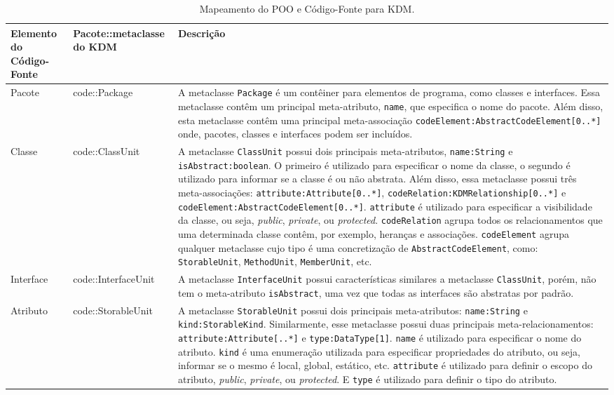 \begin{center}
\begin{longtable}{ | m{1.9cm} | m{3.57cm}| m{9.3cm} | } 
\caption{Mapeamento do POO e Código-Fonte para KDM.\label{tab:mapemanetoEntreOOPeKDM}}\\
\hline
Elemento do Código-Fonte & Pacote::metaclasse do KDM & Descrição \\ 
\hline
Pacote & code::Package & A metaclasse \texttt{Package} é um contêiner para elementos de programa, como classes e interfaces. Essa metaclasse contêm um principal meta-atributo, \texttt{name}, que especifica o nome do pacote. Além disso, esta metaclasse contêm uma principal meta-associação \texttt{codeElement:AbstractCodeElement[0..*]} onde, pacotes, classes e interfaces podem ser incluídos. \\ 
\hline
Classe & code::ClassUnit & A metaclasse \texttt{ClassUnit} possui dois principais meta-atributos,  \texttt{name:String} e \texttt{isAbstract:boolean}. O primeiro é utilizado para especificar o nome da classe, o segundo é utilizado para informar se a classe é ou não abstrata. Além disso, essa metaclasse possui três meta-associações: \texttt{attribute:Attribute[0..*]}, \texttt{codeRelation:KDMRelationship[0..*]} e  \texttt{codeElement:AbstractCodeElement[0..*]}. \texttt{attribute} é utilizado para especificar a  visibilidade da classe, ou seja, \textit{public}, \textit{private}, ou \textit{protected}. \texttt{codeRelation} agrupa todos os relacionamentos que uma determinada classe contêm, por exemplo, heranças e associações. \texttt{codeElement} agrupa qualquer metaclasse cujo tipo é uma concretização de \texttt{AbstractCodeElement}, como: \texttt{StorableUnit}, \texttt{MethodUnit}, \texttt{MemberUnit}, etc. \\ 
\hline
Interface & code::InterfaceUnit & A metaclasse \texttt{InterfaceUnit} possui características similares a metaclasse \texttt{ClassUnit}, porém, não tem o meta-atributo \texttt{isAbstract}, uma vez que todas as interfaces são abstratas por padrão. \\ 
\hline
Atributo & code::StorableUnit & A metaclasse \texttt{StorableUnit} possui dois principais meta-atributos: \texttt{name:String} e \texttt{kind:StorableKind}. Similarmente, esse metaclasse possui duas principais meta-relacionamentos: \texttt{attribute:Attribute[..*]} e \texttt{type:DataType[1]}. \texttt{name} é utilizado para especificar o nome do atributo. \texttt{kind} é uma enumeração utilizada para especificar propriedades do atributo, ou seja, informar se o mesmo é local, global, estático, etc. \texttt{attribute} é utilizado para definir o escopo do atributo, \textit{public}, \textit{private}, ou \textit{protected}. E \texttt{type} é utilizado para definir o tipo do atributo.  \\ 

\end{longtable}
\end{center}
